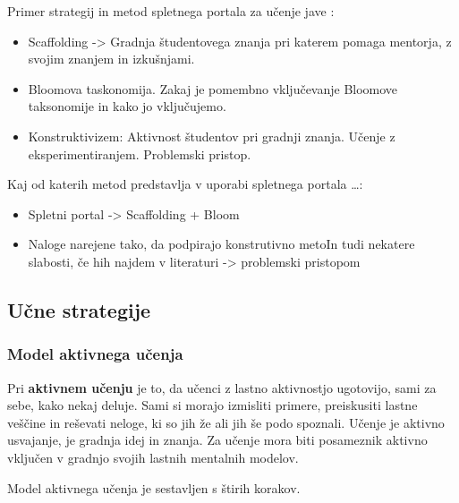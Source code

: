 Primer strategij in metod spletnega portala za učenje jave
\cite{thesisAWebP}:

\begin{itemize}
\item
  Scaffolding -\textgreater{} Gradnja študentovega znanja
  pri katerem pomaga mentorja, z svojim znanjem in izkušnjami.
\item
  Bloomova taskonomija. Zakaj je pomembno vključevanje Bloomove
  taksonomije in kako jo vključujemo.
\item
  Konstruktivizem: Aktivnost študentov pri gradnji znanja. Učenje z
  eksperimentiranjem. Problemski pristop.
\end{itemize}

Kaj od katerih metod predstavlja v uporabi spletnega portala \ldots{}:

\begin{itemize}
\item
  Spletni portal -\textgreater{} Scaffolding + Bloom
\item
  Naloge narejene tako, da podpirajo konstrutivno metoIn tudi nekatere slabosti, če hih najdem v literaturi
  -\textgreater{} problemski pristopom
\end{itemize}

\subsection{Učne strategije}
\label{sec:učne_strategije}

\subsubsection{Model aktivnega učenja}
\label{sec:model_aktivnega_učenja}

Pri \textbf{aktivnem učenju} je to, da učenci z lastno aktivnostjo
ugotovijo, sami za sebe, kako nekaj deluje. Sami si morajo izmisliti
primere, preiskusiti lastne veščine in reševati neloge, ki so jih že
ali jih še podo spoznali. Učenje je aktivno usvajanje, je gradnja idej
in znanja. Za učenje mora biti posameznik aktivno vključen v gradnjo
svojih lastnih mentalnih modelov.

Model aktivnega učenja je sestavljen s štirih korakov.

